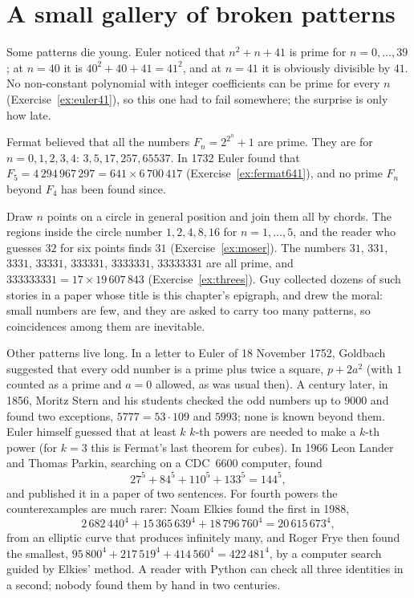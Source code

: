 \section{A small gallery of broken patterns}

Some patterns die young. Euler noticed that $n^2+n+41$ is prime for $n=0,\dots,39$; at $n=40$ it is $40^2+40+41=41^2$, and at $n=41$ it is obviously divisible
by $41$. No non-constant polynomial with integer coefficients can be prime for every $n$ (Exercise~\ref{ex:euler41}), so this one had to fail somewhere; the
surprise is only how late.

Fermat believed that all the numbers $F_n=2^{2^n}+1$ are prime. They are for $n=0,1,2,3,4$: $3,5,17,257,65537$. In 1732 Euler found that
$F_5=4\,294\,967\,297=641\times6\,700\,417$ (Exercise~\ref{ex:fermat641}), and no prime $F_n$ beyond $F_4$ has been found since.

Draw $n$ points on a circle in general position and join them all by chords. The regions inside the circle number $1,2,4,8,16$ for $n=1,\dots,5$, and the reader
who guesses $32$ for six points finds $31$ (Exercise~\ref{ex:moser}). The numbers $31$, $331$, $3331$, $33331$, $333331$, $3333331$, $33333331$ are all prime, and
$333333331=17\times19\,607\,843$ (Exercise~\ref{ex:threes}). Guy collected dozens of such stories in a paper whose title is this chapter's epigraph, and drew the
moral: small numbers are few, and they are asked to carry too many patterns, so coincidences among them are inevitable.

Other patterns live long. In a letter to Euler of 18 November 1752, Goldbach suggested that every odd number is a prime plus twice a square, $p+2a^2$ (with $1$
counted as a prime and $a=0$ allowed, as was usual then). A century later, in 1856, Moritz Stern and his students checked the odd numbers up to $9000$ and
found two exceptions, $5777=53\cdot109$ and $5993$; none is known beyond them. Euler himself guessed that at least $k$ $k$-th powers are needed to make a
$k$-th power (for $k=3$ this is Fermat's last theorem for cubes). In 1966 Leon Lander and Thomas Parkin, searching on a CDC~6600 computer, found
\[
27^5+84^5+110^5+133^5=144^5,
\]
and published it in a paper of two sentences. For fourth powers the counterexamples are much rarer: Noam Elkies found the first in 1988,
\[
2\,682\,440^4+15\,365\,639^4+18\,796\,760^4=20\,615\,673^4,
\]
from an elliptic curve that produces infinitely many, and Roger Frye then found the smallest, $95\,800^4+217\,519^4+414\,560^4=422\,481^4$, by a computer search
guided by Elkies' method. A reader with Python can check all three identities in a second; nobody found them by hand in two centuries.

